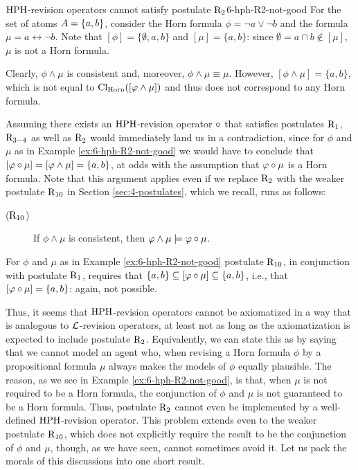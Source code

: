 \begin{xmpl}{${\mathrm{HPH}}$-revision operators cannot satisfy postulate $\mathrm{R}_{2}$}{6-hph-R2-not-good}
	For the set of atoms $A=\{a,b\}$,
	consider the Horn formula $\phi=\lnot a\lor \lnot b$
	and the formula $\mu=a\leftrightarrow \lnot b$.
	Note that $[\phi]=\{\emptyset,a,b\}$
	and $[\mu]=\{a,b\}$:
	since $\emptyset = a\cap b\notin [\mu]$,
	$\mu$ is not a Horn formula.

	Clearly, $\phi\land\mu$ is consistent
	and, moreover, $\phi\land\mu\equiv\mu$.
	However, $[\phi\land\mu]=\{a, b\}$, 
	which is not equal to ${\operatorname{Cl}}_{\mathrm{Horn}}([\varphi\land\mu])$
	and thus 
	does not correspond to any Horn formula.
\end{xmpl}

Assuming there exists an ${\mathrm{HPH}}$-revision operator $\circ$ that satisfies
postulates $\mathrm{R}_{1}$, $\mathrm{R}_{3-4}$ as well as $\mathrm{R}_{2}$ 
would immediately land us in a contradiction,
since for $\phi$ and $\mu$ as in Example \ref{ex:6-hph-R2-not-good}
we would have to conclude that
$[\varphi\circ\mu]=[\varphi\land\mu]=\{a,b\}$, 
at odds with the assumption that $\varphi\circ\mu$ is a Horn formula.
Note that this argument applies even if we replace $\mathrm{R}_{2}$
with the weaker postulate $\mathrm{R}_{10}$ in Section \ref{sec:4-postulates},
which we recall, runs as follows:

\begin{description}
	\item[($\mathrm{R}_{10}$)] If $\phi\land\mu$ is consistent, 
		then $\varphi\land\mu\models\varphi\circ\mu$.
\end{description}

For $\phi$ and $\mu$
as in Example \ref{ex:6-hph-R2-not-good}
postulate $\mathrm{R}_{10}$,
in conjunction with postulate $\mathrm{R}_{1}$,
requires that $\{a,b\}\subseteq[\varphi\circ\mu]\subseteq\{a,b\}$,
i.e., that $[\varphi\circ\mu]=\{a,b\}$:
again, not possible.

Thus, it seems that ${\mathrm{HPH}}$-revision operators cannot be axiomatized
in a way that is analogous to $\mathcal{L}$-revision operators,
at least not as long as the axiomatization 
is expected to include postulate $\mathrm{R}_{2}$.
Equivalently, we can state this as by saying 
that we cannot model an agent who, 
when revising a Horn formula $\phi$ by a propositional formula $\mu$
always makes the models of $\phi$ equally plausible.
The reason, as we see in Example \ref{ex:6-hph-R2-not-good},
is that, when $\mu$ is not required to be a Horn formula,
the conjunction of $\phi$ and $\mu$ is not guaranteed
to be a Horn formula.
Thus, postulate $\mathrm{R}_{2}$ cannot even be implemented by a well-defined 
${\mathrm{HPH}}$-revision operator.
This problem extends even to the weaker postulate $\mathrm{R}_{10}$, 
which does not explicitly require the result to be the conjunction
of $\phi$ and $\mu$, 
though, as we have seen, cannot sometimes avoid it.
Let us pack the morals of this discussions into one short result.

